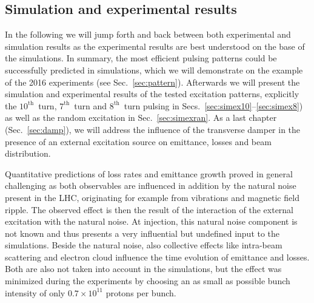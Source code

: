 \documentclass[%
 reprint,
 amsmath,amssymb,
 aps,
prstab,
]{revtex4-1}
\begin{document}
\subsection{Simulation and experimental results\label{sec:simex}}
In the following we will jump forth and back between both experimental and simulation results as the experimental results are best understood on the base of the simulations. In summary, the most efficient pulsing patterns could be successfully predicted in simulations, which we will demonstrate on the example of the 2016 experiments (see Sec.~\ref{sec:pattern}). Afterwards we will present the simulation and experimental results of the tested excitation patterns, explicitly the $10^{\mathrm{th}}$~turn, $7^{\mathrm{th}}$~turn and $8^{\mathrm{th}}$~turn pulsing in Secs.~\ref{sec:simex10}--\ref{sec:simex8}) as well as the random excitation in Sec.~\ref{sec:simexran}. As a last chapter (Sec.~\ref{sec:damp}), we will address the influence of the transverse damper in the presence of an external excitation source on emittance, losses and beam distribution.

Quantitative predictions of loss rates and emittance growth proved in general challenging as both observables are influenced in addition by the natural noise present in the LHC, originating for example from vibrations and magnetic field ripple. The observed effect is then the result of the interaction of the external excitation with the natural noise. At injection, this natural noise component is not known and thus presents a very influential but undefined input to the simulations. Beside the natural noise, also collective effects like intra-beam scattering and electron cloud influence the time evolution of emittance and losses. Both are also not taken into account in the simulations, but the effect was minimized during the experiments by choosing an as small as possible bunch intensity of only $0.7\times10^{11}$ protons per bunch.
\end{document}
